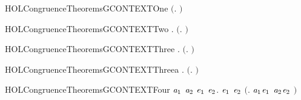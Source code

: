 \newcommand{\HOLCongruenceTheoremsCONTEXTXXWGXXcombin}{\UseVerbatim{HOLCongruenceTheoremsCONTEXTXXWGXXcombin}}
\begin{SaveVerbatim}{HOLCongruenceTheoremsGCONTEXTOne}
\HOLTokenTurnstile{}  \ensuremath{(}\HOLTokenLambda{}. \ensuremath{)}
\end{SaveVerbatim}
\newcommand{\HOLCongruenceTheoremsGCONTEXTOne}{\UseVerbatim{HOLCongruenceTheoremsGCONTEXTOne}}
\begin{SaveVerbatim}{HOLCongruenceTheoremsGCONTEXTTwo}
\HOLTokenTurnstile{} \HOLSymConst{\HOLTokenForall{}}.  \ensuremath{(}\HOLTokenLambda{}. \ensuremath{)}
\end{SaveVerbatim}
\newcommand{\HOLCongruenceTheoremsGCONTEXTTwo}{\UseVerbatim{HOLCongruenceTheoremsGCONTEXTTwo}}
\begin{SaveVerbatim}{HOLCongruenceTheoremsGCONTEXTThree}
\HOLTokenTurnstile{} \HOLSymConst{\HOLTokenForall{}} .   \HOLSymConst{\HOLTokenImp{}}  \ensuremath{(}\HOLTokenLambda{}. \HOLSymConst{\ensuremath{\ldotp}} \ensuremath{)}
\end{SaveVerbatim}
\newcommand{\HOLCongruenceTheoremsGCONTEXTThree}{\UseVerbatim{HOLCongruenceTheoremsGCONTEXTThree}}
\begin{SaveVerbatim}{HOLCongruenceTheoremsGCONTEXTThreea}
\HOLTokenTurnstile{} \HOLSymConst{\HOLTokenForall{}}.  \ensuremath{(}\HOLTokenLambda{}. \HOLSymConst{\ensuremath{\ldotp}}\ensuremath{)}
\end{SaveVerbatim}
\newcommand{\HOLCongruenceTheoremsGCONTEXTThreea}{\UseVerbatim{HOLCongruenceTheoremsGCONTEXTThreea}}
\begin{SaveVerbatim}{HOLCongruenceTheoremsGCONTEXTFour}
\HOLTokenTurnstile{} \HOLSymConst{\HOLTokenForall{}}\ensuremath{\HOLBoundVar{a}\sb{\mathrm{1}}} \ensuremath{\HOLBoundVar{a}\sb{\mathrm{2}}} \ensuremath{\HOLBoundVar{e}\sb{\mathrm{1}}} \ensuremath{\HOLBoundVar{e}\sb{\mathrm{2}}}.
        \ensuremath{\HOLBoundVar{e}\sb{\mathrm{1}}} \HOLSymConst{\HOLTokenConj{}}  \ensuremath{\HOLBoundVar{e}\sb{\mathrm{2}}} \HOLSymConst{\HOLTokenImp{}}
        \ensuremath{(}\HOLTokenLambda{}. \ensuremath{\HOLBoundVar{a}\sb{\mathrm{1}}}\HOLSymConst{\ensuremath{\ldotp}}\ensuremath{\HOLBoundVar{e}\sb{\mathrm{1}}}  \HOLSymConst{\ensuremath{+}} \ensuremath{\HOLBoundVar{a}\sb{\mathrm{2}}}\HOLSymConst{\ensuremath{\ldotp}}\ensuremath{\HOLBoundVar{e}\sb{\mathrm{2}}} \ensuremath{)}
\end{SaveVerbatim}
